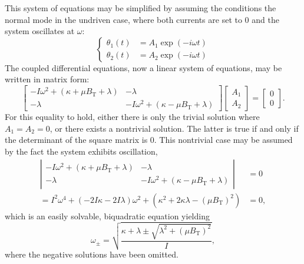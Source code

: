 \documentclass{article}
\begin{document}
This system of equations may be simplified by assuming the conditions the normal mode in the undriven case, where both currents are set to 0 and the system oscillates at $\omega$:
\begin{equation*}
  \begin{cases}
    \theta_1(t) &= A_1 \exp(-i\omega t) \\
    \theta_2(t) &= A_2 \exp(-i\omega t)
  \end{cases}
\end{equation*}
The coupled differential equations, now a linear system of equations, may be written in matrix form:
\begin{equation*}
  \left[
    \begin{matrix}
      -I\omega^2+(\kappa + \mu B_\text{T} + \lambda)   &   -\lambda \\
      -\lambda                                    &   -I\omega^2+(\kappa - \mu B_\text{T} + \lambda)
  \end{matrix} \right]\left[
    \begin{matrix} A_1 \\ A_2
  \end{matrix} \right] = \left[
    \begin{matrix} 0\\0
  \end{matrix} \right].
\end{equation*}
For this equality to hold, either there is only the trivial solution where $A_1=A_2=0$, or there exists a nontrivial solution. The latter is true if and only if the determinant of the square matrix is 0.
This nontrivial case may be assumed by the fact the system exhibits oscillation,
\begin{equation*}
  \begin{aligned}
    \left|
    \begin{matrix}
      -I\omega^2+(\kappa + \mu B_\text{T} + \lambda)   &   -\lambda \\
      -\lambda                                    &   -I\omega^2+(\kappa - \mu B_\text{T} + \lambda)
    \end{matrix} \right| &= 0 \\
    = I^2 \omega^4 + \left(-2I\kappa-2I\lambda \right)\omega^2 + \left(\kappa^2 + 2\kappa\lambda - (\mu B_\text{T})^2\right) &= 0,
  \end{aligned}
\end{equation*}
which is an easily solvable, biquadratic equation yielding
\begin{equation}
  \omega_\pm = \sqrt{\frac{\kappa+\lambda \pm \sqrt{\lambda^2 + \left(\mu B_\text{T}\right)^2}}{I}},\label{eq:omegar}
\end{equation}
where the negative solutions have been omitted.
\end{document}
